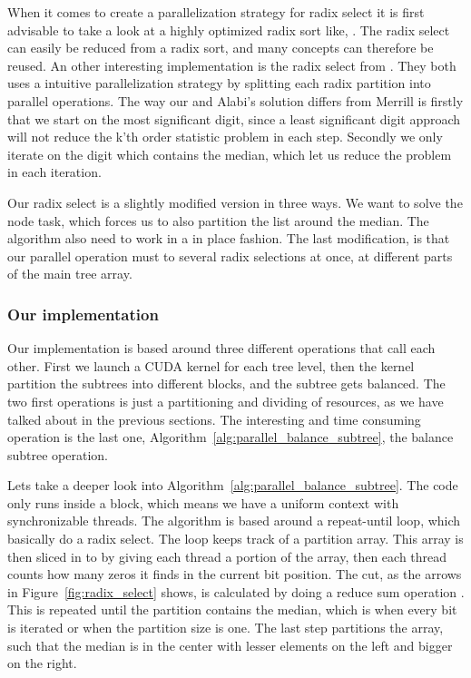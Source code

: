 When it comes to create a parallelization strategy for radix select it is first advisable to take a look at a highly optimized radix sort like, \citep{MerrillG11}. The radix select can easily be reduced from a radix sort, and many concepts can therefore be reused. An other interesting implementation is the radix select from \citep{Alabi:2012}. They both uses a intuitive parallelization strategy by splitting each radix partition into parallel operations. The way our and Alabi's solution differs from Merrill is firstly that we start on the most significant digit, since a least significant digit approach will not reduce the k'th order statistic problem in each step. Secondly we only iterate on the digit which contains the median, which let us reduce the problem in each iteration.

Our radix select is a slightly modified version in three ways. We want to solve the node task, which forces us to also partition the list around the median. The algorithm also need to work in a in place fashion. The last modification, is that our parallel operation must to several radix selections at once, at different parts of the main tree array.


\subsubsection{Our implementation} %
\label{ssub:our_implementation}


Our implementation is based around three different operations that call each other. First we launch a CUDA kernel for each tree level, then the kernel partition the subtrees into different blocks, and the subtree gets balanced. The two first operations is just a partitioning and dividing of resources, as we have talked about in the previous sections. The interesting and time consuming operation is the last one, Algorithm~\ref{alg:parallel_balance_subtree}, the balance subtree operation.


Lets take a deeper look into Algorithm~\ref{alg:parallel_balance_subtree}. The code only runs inside a block, which means we have a uniform context with synchronizable threads. The algorithm is based around a repeat-until loop, which basically do a radix select. The loop keeps track of a partition array. This array is then sliced in to by giving each thread a portion of the array, then each thread counts how many zeros it finds in the current bit position. The cut, as the arrows in Figure~\ref{fig:radix_select} shows, is calculated by doing a reduce sum operation \citep{parallel_reduction_in_cuda}. This is repeated until the partition contains the median, which is when every bit is iterated or when the partition size is one. The last step partitions the array, such that the median is in the center with lesser elements on the left and bigger on the right.

